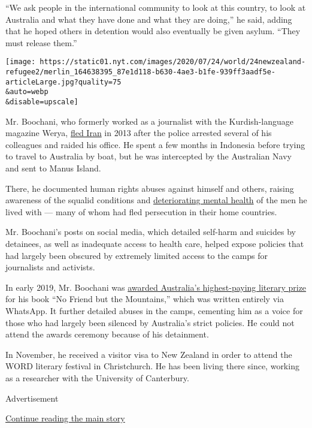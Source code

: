 ``We ask people in the international community to look at this country,
to look at Australia and what they have done and what they are doing,''
he said, adding that he hoped others in detention would also eventually
be given asylum. ``They must release them.''

\texttt{[image: https://static01.nyt.com/images/2020/07/24/world/24newzealand-refugee2/merlin\_164638395\_87e1d118-b630-4ae3-b1fe-939ff3aadf5e-articleLarge.jpg?quality=75\\\&auto=webp\\\&disable=upscale]}

Mr. Boochani, who formerly worked as a journalist with the
Kurdish-language magazine Werya,
\href{https://www.nytimes.com/2017/02/13/insider/manus-island-refugee-australia.html}{fled
Iran} in 2013 after the police arrested several of his colleagues and
raided his office. He spent a few months in Indonesia before trying to
travel to Australia by boat, but he was intercepted by the Australian
Navy and sent to Manus Island.

There, he documented human rights abuses against himself and others,
raising awareness of the squalid conditions and
\href{https://www.nytimes.com/2018/11/05/world/australia/nauru-island-asylum-refugees-children-suicide.html}{deteriorating
mental health} of the men he lived with --- many of whom had fled
persecution in their home countries.

Mr. Boochani's posts on social media, which detailed self-harm and
suicides by detainees, as well as inadequate access to health care,
helped expose policies that had largely been obscured by extremely
limited access to the camps for journalists and activists.

In early 2019, Mr. Boochani was
\href{https://www.nytimes.com/2019/01/31/world/australia/behrouz-boochani-victorian-prize-manus-island.html}{awarded
Australia's highest-paying literary prize} for his book ``No Friend but
the Mountains,'' which was written entirely via WhatsApp. It further
detailed abuses in the camps, cementing him as a voice for those who had
largely been silenced by Australia's strict policies. He could not
attend the awards ceremony because of his detainment.

In November, he received a visitor visa to New Zealand in order to
attend the WORD literary festival in Christchurch. He has been living
there since, working as a researcher with the University of Canterbury.

Advertisement

\protect\hyperlink{after-bottom}{Continue reading the main story}

